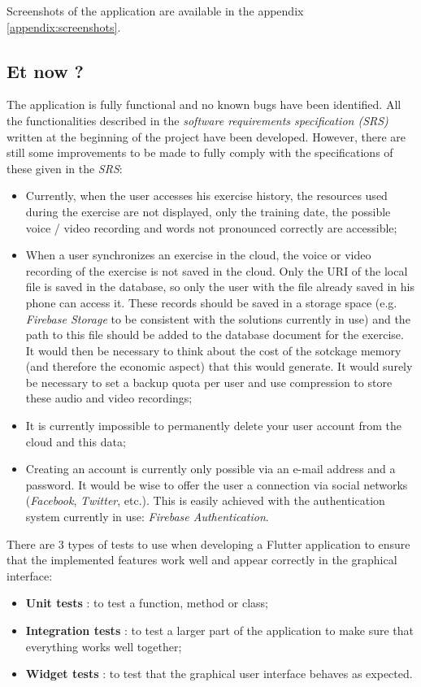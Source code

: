 Screenshots of the application are available in the appendix \ref{appendix:screenshots}.

\subsection{Et now ?}
The application is fully functional and no known bugs have been identified. All the functionalities described in the \textit{software requirements specification (SRS)} written at the beginning of the project have been developed. However, there are still some improvements to be made to fully comply with the specifications of these given in the \textit{SRS}:

\begin{itemize}
  \item Currently, when the user accesses his exercise history, the resources used during the exercise are not displayed, only the training date, the possible voice / video recording and words not pronounced correctly are accessible;
  \item When a user synchronizes an exercise in the cloud, the voice or video recording of the exercise is not saved in the cloud. Only the URI of the local file is saved in the database, so only the user with the file already saved in his phone can access it. These records should be saved in a storage space (e.g. \textit{Firebase Storage} to be consistent with the solutions currently in use) and the path to this file should be added to the database document for the exercise. It would then be necessary to think about the cost of the sotckage memory (and therefore the economic aspect) that this would generate. It would surely be necessary to set a backup quota per user and use compression to store these audio and video recordings;
  \item It is currently impossible to permanently delete your user account from the cloud and this data;
  \item Creating an account is currently only possible via an e-mail address and a password. It would be wise to offer the user a connection via social networks (\textit{Facebook}, \textit{Twitter}, etc.). This is easily achieved with the authentication system currently in use: \textit{Firebase Authentication}.
\end{itemize}

There are 3 types of tests to use when developing a Flutter application to ensure that the implemented features work well and appear correctly in the graphical interface:
\begin{itemize}
  \item \textbf{Unit tests} : to test a function, method or class;
  \item \textbf{Integration tests} : to test a larger part of the application to make sure that everything works well together;
  \item \textbf{Widget tests} : to test that the graphical user interface behaves as expected.
\end{itemize}

